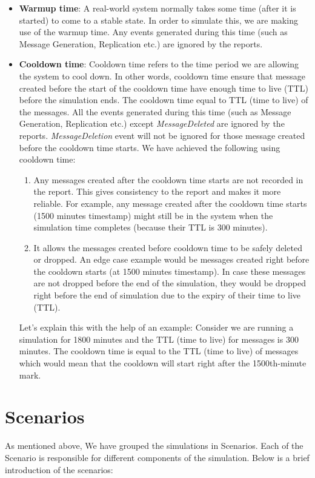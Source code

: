 \begin{itemize}
\item \textbf{Warmup time}: A real-world system normally takes some time (after it is started) to come to a stable state. In order to simulate this, we are making use of the warmup time. Any events generated during this time (such as Message Generation, Replication etc.) are ignored by the reports.
\item \textbf{Cooldown time}: Cooldown time refers to the time period we are allowing the system to cool down. In other words, cooldown time ensure that message created before the start of the cooldown time have enough time to live (TTL) before the simulation ends. The cooldown time equal to TTL (time to live) of the messages. All the events generated during this time (such as Message Generation, Replication etc.) except \textit{MessageDeleted} are ignored by the reports. \textit{MessageDeletion} event will not be ignored for those message created before the cooldown time starts. We have achieved the following using cooldown time:
\begin{enumerate}
	\item Any messages created after the cooldown time starts are not recorded in the report. This gives consistency to the report and makes it more reliable. For example, any message created after the cooldown time starts (1500 minutes timestamp) might still be in the system when the simulation time completes (because their TTL is 300 minutes).
	\item It allows the messages created before cooldown time to be safely deleted or dropped. An edge case example would be messages created right before the cooldown starts (at 1500 minutes timestamp). In case these messages are not dropped before the end of the simulation, they would be dropped right before the end of simulation due to the expiry of their time to live (TTL).
\end{enumerate}

Let's explain this with the help of an example:
Consider we are running a simulation for 1800 minutes and the TTL (time to live) for messages is 300 minutes. The cooldown time is equal to the TTL (time to live) of messages which would mean that the cooldown will start right after the 1500th-minute mark.
\end{itemize}

\section{Scenarios}
As mentioned above, We have grouped the simulations in Scenarios. Each of the Scenario is responsible for different components of the simulation. Below is a brief introduction of the scenarios:

